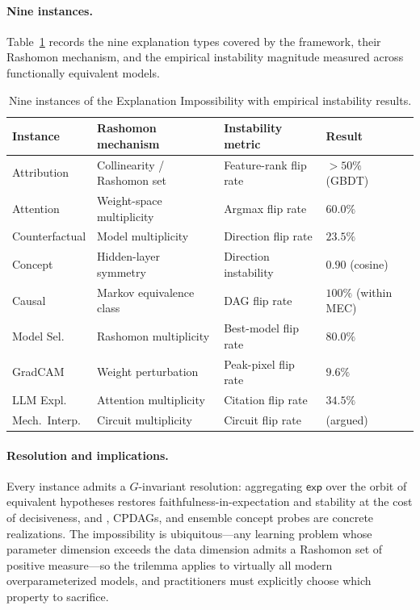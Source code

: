 \paragraph{Nine instances.}
Table~\ref{tab:summary-instances} records the nine explanation types covered
by the framework, their Rashomon mechanism, and the empirical instability
magnitude measured across functionally equivalent models.

\begin{table}[h]
\centering
\small
\caption{Nine instances of the Explanation Impossibility with
empirical instability results.}
\label{tab:summary-instances}
\begin{tabular}{llll}
\toprule
Instance & Rashomon mechanism & Instability metric & Result \\
\midrule
Attribution   & Collinearity / Rashomon set & Feature-rank flip rate
              & $>50\%$ (GBDT)\\
Attention     & Weight-space multiplicity   & Argmax flip rate
              & $60.0\%$ \\
Counterfactual & Model multiplicity         & Direction flip rate
              & $23.5\%$ \\
Concept       & Hidden-layer symmetry       & Direction instability
              & $0.90$ (cosine) \\
Causal        & Markov equivalence class    & DAG flip rate
              & $100\%$ (within MEC) \\
Model Sel.    & Rashomon multiplicity       & Best-model flip rate
              & $80.0\%$ \\
GradCAM       & Weight perturbation         & Peak-pixel flip rate
              & $9.6\%$ \\
LLM Expl.     & Attention multiplicity      & Citation flip rate
              & $34.5\%$ \\
Mech.\ Interp. & Circuit multiplicity       & Circuit flip rate
              & (argued) \\
\bottomrule
\end{tabular}
\end{table}

\paragraph{Resolution and implications.}
Every instance admits a $G$-invariant resolution: aggregating $\mathsf{exp}$
over the orbit of equivalent hypotheses restores faithfulness-in-expectation
and stability at the cost of decisiveness, and \DASH{}, CPDAGs, and ensemble
concept probes are concrete realizations.
The impossibility is ubiquitous---any learning problem whose parameter
dimension exceeds the data dimension admits a Rashomon set of positive
measure---so the trilemma applies to virtually all modern overparameterized
models, and practitioners must explicitly choose which property to sacrifice.
